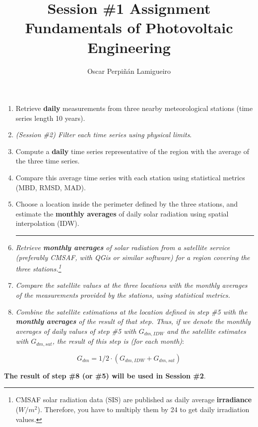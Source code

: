 \documentclass[11pt]{article}
\author{Oscar Perpiñán Lamigueiro}
\date{}
\title{Session \#1 Assignment\\\medskip
\large Fundamentals of Photovoltaic Engineering}
\begin{document}
\maketitle
\begin{enumerate}
\item Retrieve \textbf{daily} measurements from three nearby meteorological stations (time series length 10 years).
\item \emph{(Session \#2) Filter each time series using physical limits}.
\item Compute a \textbf{daily} time series representative of the region with the average of the three time series.
\item Compare this average time series with each station using statistical metrics (MBD, RMSD, MAD).
\item Choose a location inside the perimeter defined by the three stations, and estimate the \textbf{monthly averages} of daily solar radiation using spatial interpolation (IDW).

\noindent\rule{\textwidth}{0.5pt}
\item \emph{Retrieve \textbf{monthly averages} of solar radiation from a satellite service (preferably CMSAF, with QGis or similar software) for a region covering the three stations.\footnote{CMSAF solar radiation data (SIS) are published as daily average \textbf{irradiance} (\(W/m^2\)). Therefore, you have to multiply them by 24 to get daily irradiation values.}}
\item \emph{Compare the satellite values at the three locations with the monthly averages of the measurements provided by the stations, using statistical metrics.}
\item \emph{Combine the satellite estimations at the location defined in step \#5 with the \textbf{monthly averages} of the result of that step. Thus, if we denote the monthly averages of daily values of step \#5 with \(G_{dm,IDW}\) and the satellite estimates with \(G_{dm,sat}\), the result of this step is (for each month)}:
\end{enumerate}
\[G_{dm} = 1/2 \cdot (G_{dm,IDW} + G_{dm,sat})\]

\textbf{The result of step \#8 (or \#5) will be used in Session \#2}.
\end{document}
